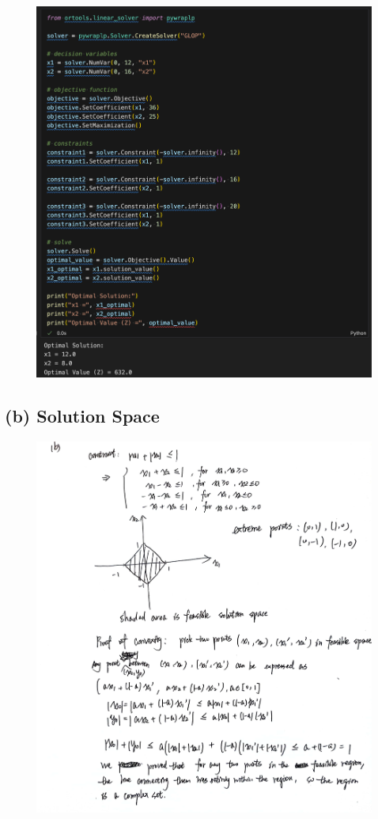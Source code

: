 \documentclass[10pt]{article}
\begin{document}
\begin{figure}[H]
  \centering
  \includegraphics[width=\linewidth]{../assets/ortools.png}
\end{figure}

\subsection*{(b) Solution Space}

\begin{figure}[H]
  \centering
  \includegraphics[width=\linewidth]{../assets/3.jpg}
\end{figure}
\end{document}
